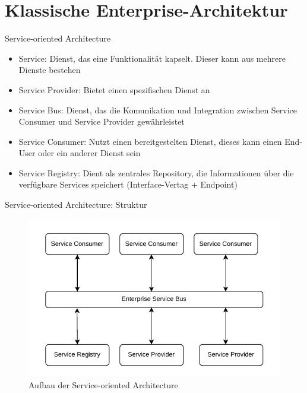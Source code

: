 \section{Klassische Enterprise-Architektur}


\begin{frame}{Service-oriented Architecture}
  \begin{itemize}
    \item Service:  Dienst, das eine Funktionalität kapselt. Dieser kann aus mehrere Dienste bestehen
    \item Service Provider: Bietet einen spezifischen Dienst an
    \item Service Bus: Dienst, das die Komunikation und Integration zwischen Service Consumer und Service Provider gewährleistet
    \item Service Consumer: Nutzt einen bereitgestelten Dienst, dieses kann einen End-User oder ein anderer Dienst sein
    \item Service Registry: Dient als zentrales Repository, die Informationen über die verfügbare Services speichert (Interface-Vertag + Endpoint)
  \end{itemize}
\end{frame}
\begin{frame}{Service-oriented Architecture: Struktur}

    \begin{figure}[!h]
        \centering
        \includegraphics[scale=0.55]{imglib/soa/soa.pdf}
        \caption{Aufbau der Service-oriented Architecture}
        \label{fig:soa}
    \end{figure}
\end{frame}

